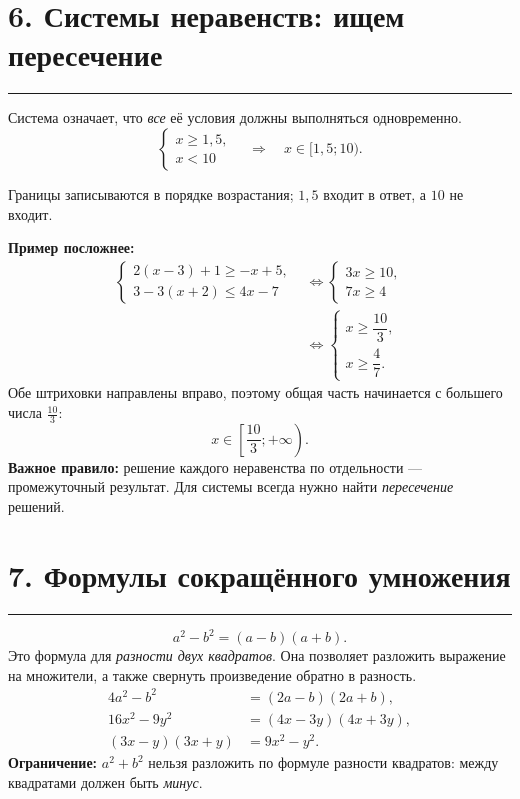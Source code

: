 \documentclass[a4paper,11pt]{article}
\newcommand{\sectionline}{\par\vspace{1pt}\noindent\color{accent}\rule{\linewidth}{0.45pt}\color{textgray}\par\vspace{3pt}}
\newcommand{\minititle}[1]{\par\vspace{3pt}{\color{darkaccent}\bfseries #1}\par\vspace{1pt}}
\newcommand{\topic}[1]{\section*{#1}\sectionline}
\newcommand{\sol}[1]{\[\displaystyle #1\]}
\begin{document}
\topic{6. Системы неравенств: ищем пересечение}
Система означает, что \emph{все} её условия должны выполняться одновременно.
\sol{\begin{cases}x\ge1{,}5,\\x<10\end{cases}
\quad\Longrightarrow\quad x\in[1{,}5;10).}
\begin{center}
\end{center}
Границы записываются в порядке возрастания; $1{,}5$ входит в ответ, а $10$ не входит.

\textbf{Пример посложнее:}
\begin{align*}
\begin{cases}
2(x-3)+1\ge -x+5,\\
3-3(x+2)\le4x-7
\end{cases}
&\Longleftrightarrow
\begin{cases}3x\ge10,\\7x\ge4\end{cases}\\[4pt]
&\Longleftrightarrow
\begin{cases}x\ge\dfrac{10}{3},\\x\ge\dfrac47.\end{cases}
\end{align*}
Обе штриховки направлены вправо, поэтому общая часть начинается с большего числа $\frac{10}{3}$:
\sol{\boxed{x\in\left[\frac{10}{3};+\infty\right).}}
\textbf{Важное правило:} решение каждого неравенства по отдельности --- промежуточный результат. Для системы всегда нужно найти \emph{пересечение} решений.

\clearpage
\topic{7. Формулы сокращённого умножения}
\minititle{Разность квадратов}
\sol{\boxed{a^2-b^2=(a-b)(a+b).}}
Это формула для \emph{разности двух квадратов}. Она позволяет разложить выражение на множители, а также свернуть произведение обратно в разность.
\begin{align*}
4a^2-b^2&=(2a-b)(2a+b),\\
16x^2-9y^2&=(4x-3y)(4x+3y),\\
(3x-y)(3x+y)&=9x^2-y^2.
\end{align*}
\textbf{Ограничение:} $a^2+b^2$ нельзя разложить по формуле разности квадратов: между квадратами должен быть \emph{минус}.
\end{document}

